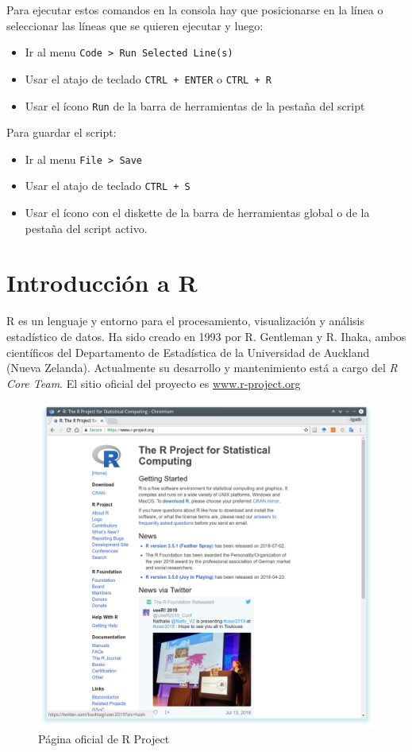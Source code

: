 \documentclass[a4paper]{book}
\providecommand{\tightlist}{%
  \setlength{\itemsep}{0pt}\setlength{\parskip}{0pt}}
\begin{document}
Para ejecutar estos comandos en la consola hay que posicionarse en la
línea o seleccionar las líneas que se quieren ejecutar y luego:

\begin{itemize}
\tightlist
\item
  Ir al menu \texttt{Code\ \textgreater{}\ Run\ Selected\ Line(s)}
\item
  Usar el atajo de teclado \texttt{CTRL\ +\ ENTER} o \texttt{CTRL\ +\ R}
\item
  Usar el ícono \texttt{Run} de la barra de herramientas de la pestaña
  del script
\end{itemize}

Para guardar el script:

\begin{itemize}
\tightlist
\item
  Ir al menu \texttt{File\ \textgreater{}\ Save}
\item
  Usar el atajo de teclado \texttt{CTRL\ +\ S}
\item
  Usar el ícono con el diskette de la barra de herramientas global o de
  la pestaña del script activo.
\end{itemize}

\hypertarget{introduccion-a-r}{%
\chapter{Introducción a R}\label{introduccion-a-r}}

R es un lenguaje y entorno para el procesamiento, visualización y
análisis estadístico de datos. Ha sido creado en 1993 por R. Gentleman y
R. Ihaka, ambos científicos del Departamento de Estadística de la
Universidad de Auckland (Nueva Zelanda). Actualmente su desarrollo y
mantenimiento está a cargo del \emph{R Core Team}. El sitio oficial del
proyecto es \url{www.r-project.org}

\begin{figure}[h]

{\centering \includegraphics[width=0.75\linewidth,]{images/rproject} 

}

\caption{Página oficial de R Project}\label{fig:unnamed-chunk-16}
\end{figure}
\end{document}
